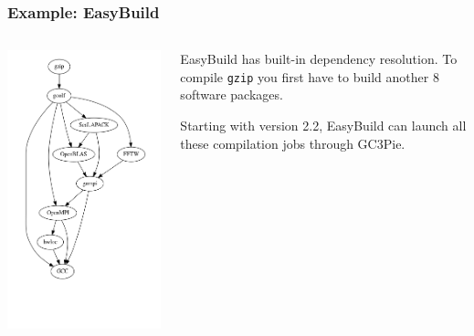 \documentclass[english,serif,mathserif,xcolor=pdftex,dvipsnames,table]{beamer}
\begin{document}
\begin{frame}
\frametitle{Example: EasyBuild}
\begin{columns}
  \begin{column}{0.4\linewidth}
    \includegraphics[height=1.00\textheight]{fig/gzip1.png}
  \end{column}
  \begin{column}{0.6\linewidth}
    \begin{flushright}
      EasyBuild has built-in dependency resolution.  To compile
      \texttt{gzip} you first have to build another 8 software
      packages.

      \+
      Starting with version 2.2, EasyBuild can launch all these
      compilation jobs through GC3Pie.
    \end{flushright}
  \end{column}
\end{columns}
\end{frame}
\end{document}
